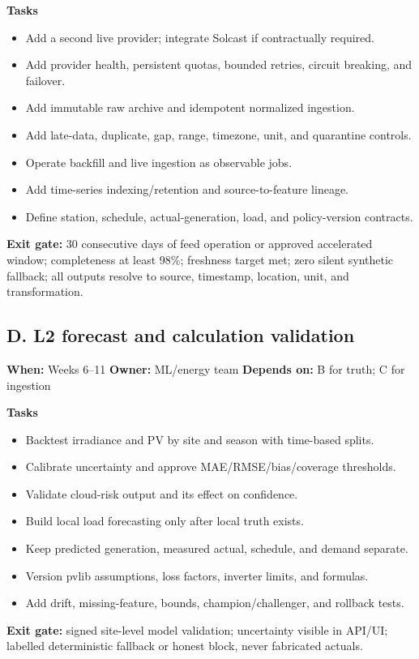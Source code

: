\documentclass[11pt,a4paper]{article}
\begin{document}
\textbf{Tasks}
\begin{itemize}
  \item Add a second live provider; integrate Solcast if contractually required.
  \item Add provider health, persistent quotas, bounded retries, circuit breaking, and failover.
  \item Add immutable raw archive and idempotent normalized ingestion.
  \item Add late-data, duplicate, gap, range, timezone, unit, and quarantine controls.
  \item Operate backfill and live ingestion as observable jobs.
  \item Add time-series indexing/retention and source-to-feature lineage.
  \item Define station, schedule, actual-generation, load, and policy-version contracts.
\end{itemize}
\textbf{Exit gate:} 30 consecutive days of feed operation or approved accelerated window;
completeness at least 98\%; freshness target met; zero silent synthetic fallback; all outputs
resolve to source, timestamp, location, unit, and transformation.

\subsection{D. L2 forecast and calculation validation}
\textbf{When:} Weeks 6--11 \quad
\textbf{Owner:} ML/energy team \quad
\textbf{Depends on:} B for truth; C for ingestion

\textbf{Tasks}
\begin{itemize}
  \item Backtest irradiance and PV by site and season with time-based splits.
  \item Calibrate uncertainty and approve MAE/RMSE/bias/coverage thresholds.
  \item Validate cloud-risk output and its effect on confidence.
  \item Build local load forecasting only after local truth exists.
  \item Keep predicted generation, measured actual, schedule, and demand separate.
  \item Version pvlib assumptions, loss factors, inverter limits, and formulas.
  \item Add drift, missing-feature, bounds, champion/challenger, and rollback tests.
\end{itemize}
\textbf{Exit gate:} signed site-level model validation; uncertainty visible in API/UI;
labelled deterministic fallback or honest block, never fabricated actuals.
\end{document}
